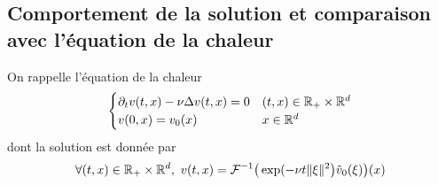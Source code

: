 
\subsection{Comportement de la solution et comparaison avec l'équation de la chaleur}

\begin{frame}
    On rappelle l'équation de la chaleur
\begin{equation*}
    \begin{cases}
        \partial_tv(t,x)-\nu\Delta v(t,x)=0 & (t,x) \in \mathbb{R}_+ \times \mathbb{R}^d \\
        v(0,x) = v_0(x) & x \in \mathbb{R}^d
    \end{cases}
\end{equation*}
dont la solution est donnée par 
\begin{equation*}
    \forall (t,x) \in \mathbb{R}_+ \times \mathbb{R}^d, \ v(t,x) = \mathcal{F}^{-1}\big(\exp(-\nu t\|\xi\|^2\big)\hat{v}_0(\xi)\big)(x)
\end{equation*}
\end{frame}


